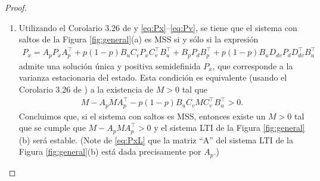 \begin{proof}{\ \\}
\begin{enumerate}
\item Utilizando el Corolario 3.26 de \cite{cofrma05} y \eqref{eq:Px}--\eqref{eq:Pv}, se tiene que el sistema con saltos de la Figura \ref{fig:general}(a) es MSS si y s\'olo si la expresi\'on
\begin{align}\label{eq:lyapunov-generalizada}
P_x = A_p P_x A_p^{\intercal} + p(1-p)B_u C_v P_x C_v^{\intercal} B_u^{\intercal} + B_p P_d B_p^{\intercal} + p(1-p) B_u D_{dv} P_d D_{dv}^{\intercal} B_u^{\intercal}
\end{align}
admite una soluci\'on \'unica y positiva semidefinida $P_x$, que corresponde a la varianza estacionaria del estado. Esta condici\'on es equivalente (usando el Corolario 3.26 de \cite{cofrma05}) a la existencia de $M>0$ tal que
\begin{align}\label{eq:condicion-mss}
M-A_p M A_p^{\intercal} - p(1-p)B_uC_v M C_v^{\intercal}B_u^{\intercal} >0.
\end{align}
Concluimos que, si el sistema con saltos es MSS, entonces existe un $M>0$ tal que se cumple que $M-A_pMA_p^{\intercal}>0$ y el sistema LTI de la Figura \ref{fig:general}(b) ser\'a estable. (Note de \eqref{eq:PxL} que la matriz ``A'' del sistema LTI de la Figura \ref{fig:general}(b) est\'a dada precisamente por $A_p$.)


\end{enumerate}
\end{proof}
